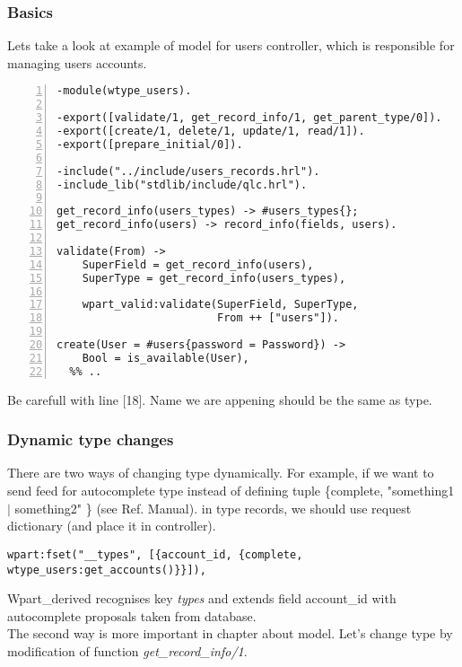 \subsubsection{Basics}
Lets take a look at example of model for users controller, which is
responsible for managing users accounts. \\
\begin{Verbatim}[frame=single,
       framesep=2mm,
       label=wtype\_users.ert,labelposition=topline,fontsize=\small,numbers=left]
-module(wtype_users).

-export([validate/1, get_record_info/1, get_parent_type/0]).
-export([create/1, delete/1, update/1, read/1]).
-export([prepare_initial/0]).

-include("../include/users_records.hrl").
-include_lib("stdlib/include/qlc.hrl").

get_record_info(users_types) -> #users_types{};
get_record_info(users) -> record_info(fields, users).

validate(From) -> 
    SuperField = get_record_info(users),
    SuperType = get_record_info(users_types),

    wpart_valid:validate(SuperField, SuperType, 
                         From ++ ["users"]).

create(User = #users{password = Password}) ->
    Bool = is_available(User),
  %% ..
\end{Verbatim}
Be carefull with line [18]. Name we are appening should be the same as type. 

\subsubsection{Dynamic type changes}
There are two ways of changing type dynamically. For example, if we want to send feed for
autocomplete type instead of defining tuple \{complete, "something1 $|$
something2" \} (see Ref. Manual).
in type records, we should use request dictionary (and place it in controller). \\
\begin{Verbatim}[frame=single,
       framesep=2mm, 
       label=controller.erl,labelposition=topline,fontsize=\small]
 wpart:fset("__types", [{account_id, {complete, wtype_users:get_accounts()}}]),
\end{Verbatim}
Wpart\_derived recognises key \emph{types} and extends field account\_id with
autocomplete proposals taken from database.
\\
The second way is more important in chapter about model. Let's change type by
modification of function \emph{get\_record\_info/1}.

